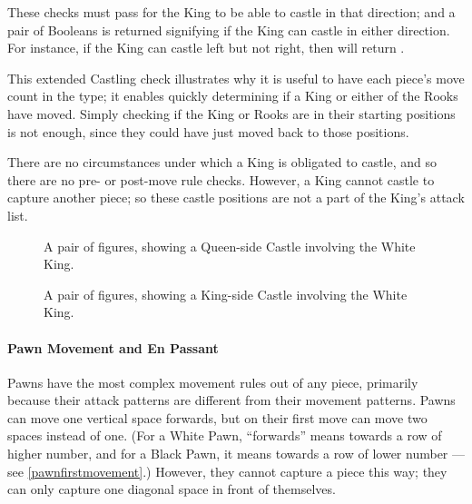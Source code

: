These checks must pass for the King to be able to castle in that direction; and a pair of Booleans is returned signifying if the King can castle in either direction. For instance, if the King can castle left but not right, then  will return .

This extended Castling check illustrates why it is useful to have each piece's move count in the  type; it enables quickly determining if a King or either of the Rooks have moved. Simply checking if the King or Rooks are in their starting positions is not enough, since they could have just moved back to those positions.

There are no circumstances under which a King is obligated to castle, and so there are no pre- or post-move rule checks. However, a King cannot castle to capture another piece; so these castle positions are not a part of the King's attack list.

\begin{figure}[h]
    \centering
    \showboard
    \quad
    \showboard
    \caption{A pair of figures, showing a Queen-side Castle involving the White King.}
    \label{queensidecastle}
\end{figure}

\begin{figure}[h]
    \centering
    \showboard
    \quad
    \showboard
    \caption{A pair of figures, showing a King-side Castle involving the White King.}
    \label{kingsidecastle}
\end{figure}

\paragraph{Pawn Movement and En Passant} \label{passantsection}

Pawns have the most complex movement rules out of any piece, primarily because their attack patterns are different from their movement patterns. Pawns can move one vertical space forwards, but on their first move can move two spaces instead of one. (For a White Pawn, ``forwards'' means towards a row of higher number, and for a Black Pawn, it means towards a row of lower number --- see \cref{pawnfirstmovement}.) However, they cannot capture a piece this way; they can only capture one diagonal space in front of themselves.

